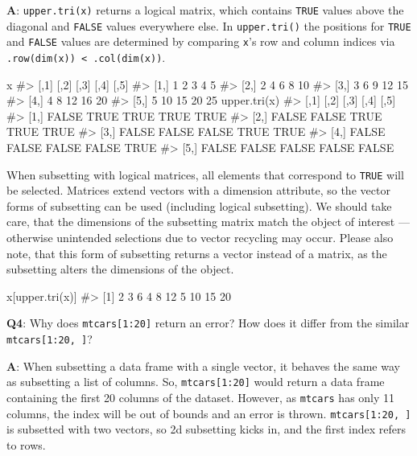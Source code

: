 \documentclass[
]{krantz}
\makeatletter
\newenvironment{Shaded}{\begin{snugshade}}{\end{snugshade}}
\newcommand{\CommentTok}[1]{\textcolor[rgb]{0.56,0.35,0.01}{\textit{#1}}}
\newcommand{\KeywordTok}[1]{\textcolor[rgb]{0.13,0.29,0.53}{\textbf{#1}}}
\newcommand{\NormalTok}[1]{#1}
\newenvironment{kframe}{%
\medskip{}
\setlength{\fboxsep}{.8em}
 \def\at@end@of@kframe{}%
 \ifinner\ifhmode%
  \def\at@end@of@kframe{\end{minipage}}%
  \begin{minipage}{\columnwidth}%
 \fi\fi%
 \def\FrameCommand##1{\hskip\@totalleftmargin \hskip-\fboxsep
 \colorbox{shadecolor}{##1}\hskip-\fboxsep
     \hskip-\linewidth \hskip-\@totalleftmargin \hskip\columnwidth}%
 \MakeFramed {\advance\hsize-\width
   \@totalleftmargin\z@ \linewidth\hsize
   \@setminipage}}%
 {\par\unskip\endMakeFramed%
 \at@end@of@kframe}
\renewenvironment{Shaded}{\begin{kframe}}{\end{kframe}}
\renewcommand{\KeywordTok} [1]{\textcolor[rgb]{0.00,0.44,0.13}{{#1}}}
\renewcommand{\CommentTok} [1]{\textcolor[rgb]{0.38,0.63,0.69}{{#1}}}
\renewcommand{\NormalTok}  [1]{{#1}}
\makeatother
\begin{document}
\textbf{{A}}: \texttt{upper.tri(x)} returns a logical matrix, which contains \texttt{TRUE} values above the diagonal and \texttt{FALSE} values everywhere else. In \texttt{upper.tri()} the positions for \texttt{TRUE} and \texttt{FALSE} values are determined by comparing \texttt{x}'s row and column indices via \texttt{.row(dim(x))\ \textless{}\ .col(dim(x))}.

\begin{Shaded}
\begin{Highlighting}[]
\NormalTok{x}
\CommentTok{#>      [,1] [,2] [,3] [,4] [,5]}
\CommentTok{#> [1,]    1    2    3    4    5}
\CommentTok{#> [2,]    2    4    6    8   10}
\CommentTok{#> [3,]    3    6    9   12   15}
\CommentTok{#> [4,]    4    8   12   16   20}
\CommentTok{#> [5,]    5   10   15   20   25}
\KeywordTok{upper.tri}\NormalTok{(x)}
\CommentTok{#>       [,1]  [,2]  [,3]  [,4]  [,5]}
\CommentTok{#> [1,] FALSE  TRUE  TRUE  TRUE  TRUE}
\CommentTok{#> [2,] FALSE FALSE  TRUE  TRUE  TRUE}
\CommentTok{#> [3,] FALSE FALSE FALSE  TRUE  TRUE}
\CommentTok{#> [4,] FALSE FALSE FALSE FALSE  TRUE}
\CommentTok{#> [5,] FALSE FALSE FALSE FALSE FALSE}
\end{Highlighting}
\end{Shaded}

When subsetting with logical matrices, all elements that correspond to \texttt{TRUE} will be selected. Matrices extend vectors with a dimension attribute, so the vector forms of subsetting can be used (including logical subsetting). We should take care, that the dimensions of the subsetting matrix match the object of interest --- otherwise unintended selections due to vector recycling may occur. Please also note, that this form of subsetting returns a vector instead of a matrix, as the subsetting alters the dimensions of the object.

\begin{Shaded}
\begin{Highlighting}[]
\NormalTok{x[}\KeywordTok{upper.tri}\NormalTok{(x)]}
\CommentTok{#>  [1]  2  3  6  4  8 12  5 10 15 20}
\end{Highlighting}
\end{Shaded}

\textbf{{Q4}}: Why does \texttt{mtcars{[}1:20{]}} return an error? How does it differ from the similar \texttt{mtcars{[}1:20,\ {]}}?

\textbf{{A}}: When subsetting a data frame with a single vector, it behaves the same way as subsetting a list of columns. So, \texttt{mtcars{[}1:20{]}} would return a data frame containing the first 20 columns of the dataset. However, as \texttt{mtcars} has only 11 columns, the index will be out of bounds and an error is thrown. \texttt{mtcars{[}1:20,\ {]}} is subsetted with two vectors, so 2d subsetting kicks in, and the first index refers to rows.
\end{document}
